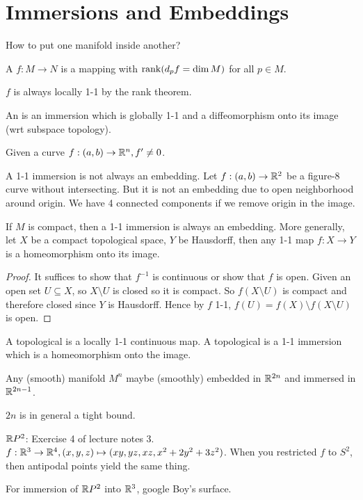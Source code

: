 \documentclass[12pt,class=article,crop=false]{standalone}
\begin{document}
\section{Immersions and Embeddings}

How to put one manifold inside another?

\begin{defn}
A  $ f: M \to N$ is a mapping with $ \operatorname{rank} (d_pf = \dim M)$ for all $ p \in M$.
\end{defn}

\begin{remark}
$ f$ is always locally 1-1 by the rank theorem.
\end{remark}

\begin{defn}
An  is an immersion which is globally 1-1 and a diffeomorphism onto its image (wrt subspace topology). 
\end{defn}
\begin{eg}[immersion]
Given a curve $ f:(a,b) \to \mathbb{R}^{n}, f'\neq 0$. 
\end{eg}
\begin{eg}
A 1-1 immersion is not always an embedding. Let $ f: (a,b) \to \mathbb{R}^2$ be a figure-8 curve without intersecting. But it is not an embedding due to open neighborhood around origin. We have 4 connected components if we remove origin in the image.
\end{eg}
\begin{prop}
If $ M$ is compact, then a 1-1 immersion is always an embedding. More generally, let $ X$ be a compact topological space,  $ Y$ be Hausdorff, then any 1-1 map  $ f: X \to Y$ is a homeomorphism onto its image.
\end{prop}
\begin{proof}
It suffices to show that $ f^{-1}$ is continuous or show that $ f$ is open. Given an open set $ U \subseteq X$, so $ X\setminus U$ is closed so it is compact. So $ f(X \setminus U)$ is compact and therefore closed since $ Y$ is Hausdorff. Hence by $ f$ 1-1, $ f(U) = f(X) \setminus f(X\setminus U)$ is open.
\end{proof}

\begin{defn}
	A topological  is a locally 1-1 continuous map. A topological  is a 1-1 immersion which is a homeomorphism onto the image. 
\end{defn}

\begin{thm}
Any (smooth) manifold $ M^{n}$ maybe (smoothly) embedded in $ \mathbb{R}^{2n}$ and immersed in $ \mathbb{R}^{2n-1}$. 
\end{thm}
\begin{remark}
$ 2n$ is in general a tight bound.
\end{remark}
\begin{eg}
$ \mathbb{R} P^2$: Exercise 4 of lecture notes 3. $ f: \mathbb{R}^3 \to \mathbb{R}^{4}, (x,y,z)\mapsto (xy, yz,xz,x^2+2y^2+3z^2)$. When you restricted $ f$ to  $ S^2$, then antipodal points yield the same thing.

For immersion of $ \mathbb{R} P^2$ into $ \mathbb{R}^3$, google Boy's surface.
\end{eg}
\end{document}
